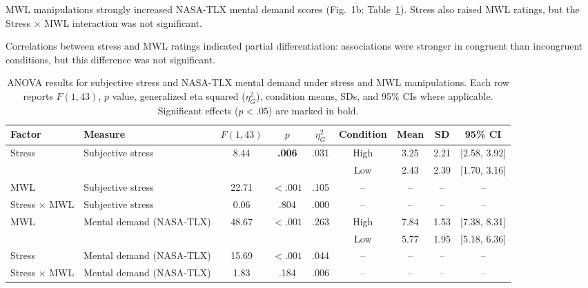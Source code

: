 \documentclass[lettersize,journal]{IEEEtran}
\begin{document}
MWL manipulations strongly increased NASA-TLX mental demand scores (Fig.~1b; Table~\ref{tab:anova_results}). Stress also raised MWL ratings, but the Stress $\times$ MWL interaction was not significant.

Correlations between stress and MWL ratings indicated partial differentiation: associations were stronger in congruent than incongruent conditions, but this difference was not significant.

\begin{table}[!t]
\centering
\caption{ANOVA results for subjective stress and NASA-TLX mental demand under stress and MWL manipulations. Each row reports $F(1,43)$, $p$ value, generalized eta squared ($\eta^2_G$), condition means, SDs, and 95\% CIs where applicable. Significant effects ($p < .05$) are marked in bold.}
\label{tab:anova_results}
\begin{tabular}{llccccccc}
\toprule
Factor & Measure & $F(1,43)$ & $p$ & $\eta^2_G$ & Condition & Mean & SD & 95\% CI \\
\midrule
\multirow{2}{*}{Stress} & \multirow{2}{*}{Subjective stress}
& 8.44 & \textbf{.006} & .031 & High & 3.25 & 2.21 & [2.58, 3.92] \\
& & & & & Low & 2.43 & 2.39 & [1.70, 3.16] \\
MWL & Subjective stress
& 22.71 & \textbf{$<.001$} & .105 & -- & -- & -- & -- \\
Stress $\times$ MWL & Subjective stress
& 0.06 & .804 & .000 & -- & -- & -- & -- \\
\midrule
MWL & \multirow{2}{*}{Mental demand (NASA-TLX)}
& 48.67 & \textbf{$<.001$} & .263 & High & 7.84 & 1.53 & [7.38, 8.31] \\
& & & & & Low & 5.77 & 1.95 & [5.18, 6.36] \\
Stress & Mental demand (NASA-TLX)
& 15.69 & \textbf{$<.001$} & .044 & -- & -- & -- & -- \\
Stress $\times$ MWL & Mental demand (NASA-TLX)
& 1.83 & .184 & .006 & -- & -- & -- & -- \\
\bottomrule
\end{tabular}
\end{table}
\end{document}
